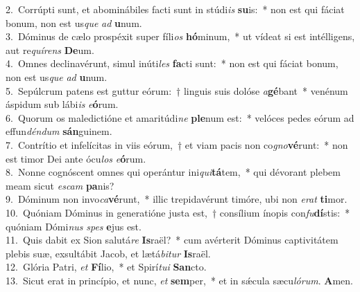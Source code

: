 {2.~}Corrúpti sunt, et abominábiles facti sunt in stúdi\textit{is} \textbf{su}is:~* non est qui fáciat bonum, non est us\textit{que} \textit{ad} \textbf{u}num.\\
{3.~}Dóminus de cælo prospéxit super fíli\textit{os} \textbf{hó}minum,~* ut vídeat si est intélligens, aut re\textit{quí}\textit{rens} \textbf{De}um.\\
{4.~}Omnes declinavérunt, simul inúti\textit{les} \textbf{fa}cti sunt:~* non est qui fáciat bonum, non est us\textit{que} \textit{ad} \textbf{u}num.\\
{5.~}Sepúlcrum patens est guttur eórum:~† linguis suis dolóse \textit{a}\textbf{gé}bant~* venénum áspidum sub lábi\textit{is} \textit{e}\textbf{ó}rum.\\
{6.~}Quorum os maledictióne et amaritúdi\textit{ne} \textbf{ple}num est:~* velóces pedes eórum ad effun\textit{dén}\textit{dum} \textbf{sán}guinem.\\
{7.~}Contrítio et infelícitas in viis eórum,~† et viam pacis non co\textit{gno}\textbf{vé}runt:~* non est timor Dei ante ócu\textit{los} \textit{e}\textbf{ó}rum.\\
{8.~}Nonne cognóscent omnes qui operántur ini\textit{qui}\textbf{tá}tem,~* qui dévorant plebem meam sicut \textit{e}\textit{scam} \textbf{pa}nis?\\
{9.~}Dóminum non invo\textit{ca}\textbf{vé}runt,~* illic trepidavérunt timóre, ubi non \textit{e}\textit{rat} \textbf{ti}mor.\\
{10.~}Quóniam Dóminus in generatióne justa est,~† consílium ínopis con\textit{fu}\textbf{dí}stis:~* quóniam Dómi\textit{nus} \textit{spes} \textbf{e}jus est.\\
{11.~}Quis dabit ex Sion salutá\textit{re} \textbf{Is}raël?~* cum avérterit Dóminus captivitátem plebis suæ, exsultábit Jacob, et lætá\textit{bi}\textit{tur} \textbf{Is}raël.\\
{12.~}Glória Patri, \textit{et} \textbf{Fí}lio,~* et Spirí\textit{tu}\textit{i} \textbf{San}cto.\\
{13.~}Sicut erat in princípio, et nunc, \textit{et} \textbf{sem}per,~* et in sǽcula sæcu\textit{ló}\textit{rum}. \textbf{A}men.\\
